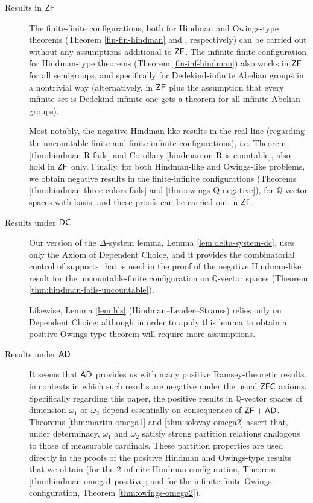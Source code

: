 \documentclass[10pt,a4paper]{amsart}
\theoremstyle{definition}
\newcommand{\zf}{\mathnormal{\mathsf{ZF}}}
\newcommand{\dc}{\mathnormal{\mathsf{DC}}}
\newcommand{\ad}{\mathnormal{\mathsf{AD}}}
\newcommand{\zfc}{\mathnormal{\mathsf{ZFC}}}
\theoremstyle{remark}
\numberwithin{equation}{section}
\begin{document}
\begin{description}

\item[Results in $\zf$] The finite-finite configurations, both for Hindman and Owings-type theorems (Theorem \ref{fin-fin-hindman} and \cite[Theorem 1]{FernandezSarmientoVera2024}, respectively) can be carried out without any assumptions additional to $\zf$. The infinite-finite configuration for Hindman-type theorems (Theorem \ref{fin-inf-hindman}) also works in $\zf$ for all semigroups, and specifically for Dedekind-infinite Abelian groups in a nontrivial way (alternatively, in $\zf$ plus the assumption that every infinite set is Dedekind-infinite one gets a theorem for all infinite Abelian groups).

Most notably, the negative Hindman-like results in the real line (regarding the uncountable-finite and finite-infinite configurations), i.e. Theorem \ref{thm:hindman-R-fails} and Corollary \ref{hindman-on-R-is-countable}, also hold in $\zf$ only. Finally, for both Hindman-like and Owings-like problems, we obtain negative results in the finite-infinite configurations (Theorems \ref{thm:hindman-three-colors-fails} and \ref{thm:owings-Q-negative}), for $\mathbb Q$-vector spaces with basis, and these proofs can be carried out in $\zf$.

\item[Results under $\dc$]
Our version of the $\Delta$-system lemma, Lemma \ref{lem:delta-system-dc}, uses only the Axiom of Dependent Choice, and it provides the combinatorial control of supports that is used in the proof of the negative Hindman-like result for the uncountable-finite configuration on $\mathbb Q$-vector spaces (Theorem \ref{thm:hindman-fails-uncountable}).

Likewise, Lemma \ref{lem:hls} (Hindman–Leader–Strauss) relies only on Dependent Choice; although in order to apply this lemma to obtain a positive Owings-type theorem will require more assumptions.

\item[Results under $\ad$]
It seems that $\ad$ provides us with many positive Ramsey-theoretic results, in contexts in which such results are negative under the usual $\zfc$ axioms. Specifically regarding this paper, the positive results in $\mathbb Q$-vector spaces of dimension $\omega_1$ or $\omega_2$ depend essentially on consequences of $\zf+\ad$. Theorems \ref{thm:martin-omega1} and \ref{thm:solovay-omega2} assert that, under determinacy, $\omega_1$ and $\omega_2$ satisfy strong partition relations analogous to those of measurable cardinals. These partition properties are used directly in the proofs of the positive Hindman and Owings-type results that we obtain (for the $2$-infinite Hindman configuration, Theorem \ref{thm:hindman-omega1-positive}; and for the infinite-finite Owings configuration, Theorem \ref{thm:owings-omega2}).


\end{description}
\end{document}
